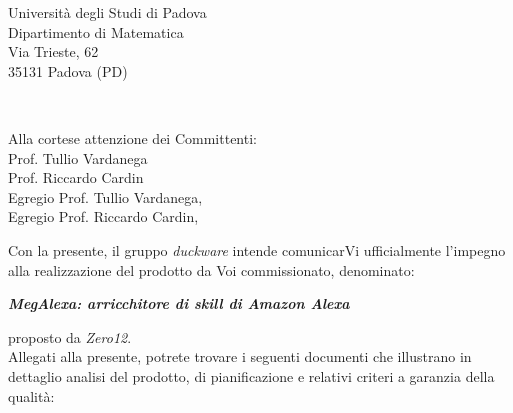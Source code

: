 \documentclass[a4paper,12pt]{article}
\begin{document}
	
\begin{center}
\begin{minipage}{0.275\textwidth}
  \begin{flushleft} 
  \end{flushleft}
\end{minipage}%
\begin{minipage}{0.275\textwidth}
  \begin{flushleft} 
  \end{flushleft}
\end{minipage}%
\begin{minipage}{0.45\textwidth}
  \begin{flushleft}
    Università degli Studi di Padova\\
    Dipartimento di Matematica\\
    Via Trieste, 62 \\
    35131 Padova (PD)
  \end{flushleft}
\end{minipage}\\[1.5cm]
\end{center}
\begin{flushleft}
\begin{minipage}{0.50\textwidth}
  \begin{flushleft} 
  	Alla cortese attenzione dei Committenti:\\
  	Prof.  Tullio Vardanega\\
  	Prof.  Riccardo Cardin\\[1cm]
  	Egregio Prof.  Tullio Vardanega,\\
  	Egregio Prof.  Riccardo Cardin,\\[0.3cm]
  \end{flushleft}
\end{minipage}
\end{flushleft}
Con la presente, il gruppo \emph{duckware} intende comunicarVi ufficialmente l’impegno alla realizzazione del prodotto da Voi commissionato, denominato:
\begin{center}
\textbf{\textit{MegAlexa: arricchitore di skill di Amazon Alexa}}
\end{center}
proposto da \emph{Zero12}.\\[0.5cm]
Allegati alla presente, potrete trovare i seguenti documenti che illustrano in dettaglio analisi del prodotto, di pianificazione e relativi criteri a garanzia della qualità:
\end{document}
